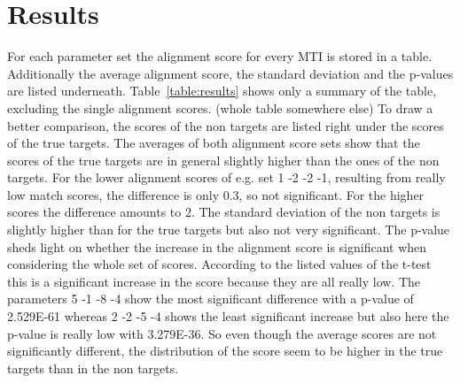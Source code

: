 \documentclass[12pt]{article}
\begin{document}
\section{Results}
For each parameter set the alignment score for every MTI is stored in a table. Additionally the average alignment score, the standard deviation and the p-values are listed underneath. Table~\ref{table:results} shows only a summary of the table, excluding the single alignment scores. (whole table somewhere else) To draw a better comparison, the scores of the non targets are listed right under the scores of the true targets. The averages of both alignment score sets show that the scores of the true targets are in general slightly higher than the ones of the non targets. For the lower alignment scores of e.g. set 1 -2 -2 -1, resulting from really low match scores, the difference is only 0.3, so not significant. For the higher scores the difference amounts to 2. The standard deviation of the non targets is slightly higher than for the true targets but also not very significant. The p-value sheds light on whether the increase in the alignment score is significant when considering the whole set of scores. According to the listed values of the t-test this is a significant increase in the score because they are all really low. The parameters 5 -1 -8 -4 show the most significant difference with a p-value of 2.529E-61 whereas 2 -2 -5 -4 shows the least significant increase but also here the p-value is really low with 3.279E-36. So even though the average scores are not significantly different, the distribution of the score seem to be higher in the true targets than in the non targets.
\end{document}
